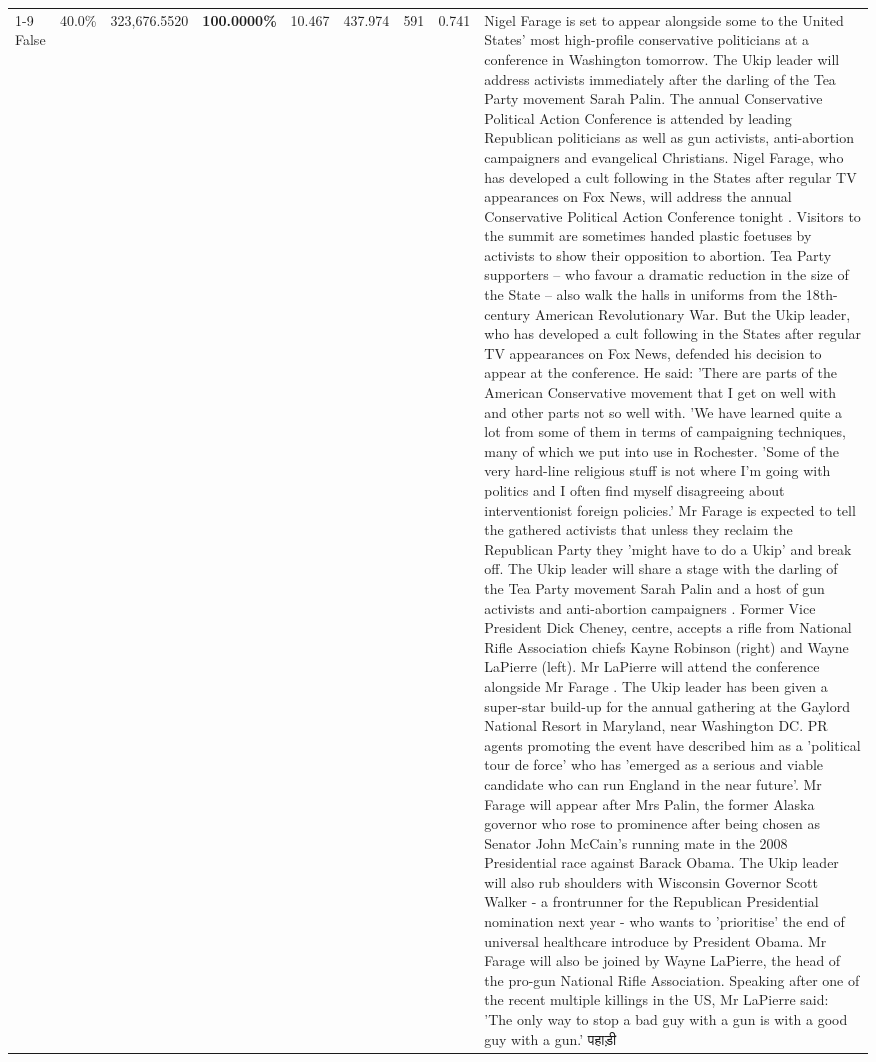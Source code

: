 \begin{table}[H]
\begin{tabular}{lllrlllll}
\cline{1-9}
False & 40.0\% & 323,676.5520 & \bfseries \color{red} 100.0000\% & 10.467 & 437.974 & 591 & 0.741 & Nigel Farage is set to appear alongside some to the United States' most high-profile conservative politicians at a conference in Washington tomorrow. The Ukip leader will address activists immediately after the darling of the Tea Party movement Sarah Palin. The annual Conservative Political Action Conference is attended by leading Republican politicians as well as gun activists, anti-abortion campaigners and evangelical Christians. Nigel Farage, who has developed a cult following in the States after regular TV appearances on Fox News, will address the annual Conservative Political Action Conference tonight . Visitors to the summit are sometimes handed plastic foetuses by activists to show their opposition to abortion. Tea Party supporters – who favour a dramatic reduction in the size of the State – also walk the halls in uniforms from the 18th-century American Revolutionary War. But the Ukip leader, who has developed a cult following in the States after regular TV appearances on Fox News, defended his decision to appear at the conference. He said: 'There are parts of the American Conservative movement that I get on well with and other parts not so well with. 'We have learned quite a lot from some of them in terms of campaigning techniques, many of which we put into use in Rochester. 'Some of the very hard-line religious stuff is not where I'm going with politics and I often find myself disagreeing about interventionist foreign policies.' Mr Farage is expected to tell the gathered activists that unless they reclaim the Republican Party they 'might have to do a Ukip' and break off. The Ukip leader will share a stage with the darling of the Tea Party movement Sarah Palin and a host of gun activists and anti-abortion campaigners . Former Vice President Dick Cheney, centre, accepts a rifle from National Rifle Association chiefs Kayne Robinson (right) and Wayne LaPierre (left). Mr LaPierre will attend the conference alongside Mr Farage . The Ukip leader has been given a super-star build-up for the annual gathering at the Gaylord National Resort in Maryland, near Washington DC. PR agents promoting the event have described him as a 'political tour de force' who has 'emerged as a serious and viable candidate who can run England in the near future'. Mr Farage will appear after Mrs Palin, the former Alaska governor who rose to prominence after being chosen as Senator John McCain's running mate in the 2008 Presidential race against Barack Obama. The Ukip leader will also rub shoulders with Wisconsin Governor Scott Walker - a frontrunner for the Republican Presidential nomination next year - who wants to 'prioritise' the end of universal healthcare introduce by President Obama. Mr Farage will also be joined by Wayne LaPierre, the head of the pro-gun National Rifle Association. Speaking after one of the recent multiple killings in the US, Mr LaPierre said: 'The only way to stop a bad guy with a gun is with a good guy with a gun.' पहाड़ी \\

\end{tabular}
\end{table}
